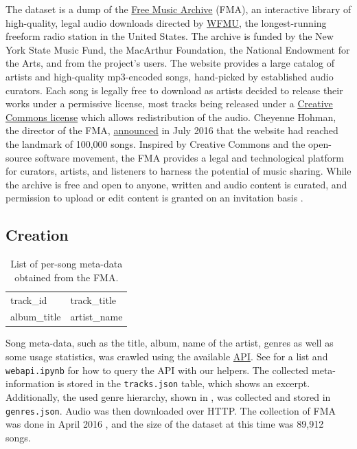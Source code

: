 \documentclass{article}
\newcommand{\todo}[1]{{\color{red} #1 }}
\begin{document}

The dataset is a dump of the \href{https://freemusicarchive.org/}{Free Music Archive} (FMA), an interactive library of high-quality, legal audio downloads directed by \href{https://wfmu.org/}{WFMU}, the longest-running freeform radio station in the United States.
The archive is funded by the New York State Music Fund, the MacArthur Foundation, the National Endowment for the Arts, and from the project's users.
The website provides a large catalog of artists and high-quality mp3-encoded songs, hand-picked by established audio curators. Each song is legally free to download as artists decided to release their works under a permissive license, most tracks being released under a \href{https://creativecommons.org/}{Creative Commons license} which allows redistribution of the audio. Cheyenne Hohman, the director of the FMA, \href{http://freemusicarchive.org/member/cheyenne_h/blog/100000_SONGS}{announced} in July 2016 that the website had reached the landmark of 100,000 songs.
Inspired by Creative Commons and the open-source software movement, the FMA provides a legal and technological platform for curators, artists, and listeners to harness the potential of music sharing. While the archive is free and open to anyone, written and audio content is curated, and permission to upload or edit content is granted on an invitation basis \cite{art:MossFMA}.

\subsection{Creation} %

\begin{table}
	\centering
	\begin{tabular}{|ll|}
		\hline
		track\_id & track\_title \\
		album\_title & artist\_name \\
		\hline
	\end{tabular}
	\caption{List of per-song meta-data obtained from the FMA.}
	\label{tab:metadata}
\end{table}

Song meta-data, such as the title, album, name of the artist, genres as well as some usage statistics, was crawled using the available \href{https://freemusicarchive.org/api}{API}. See  for a list and \texttt{webapi.ipynb} for how to query the API with our helpers. The collected meta-information is stored in the \texttt{tracks.json} table, which  shows an excerpt. Additionally, the used genre hierarchy, shown in , was collected and stored in \texttt{genres.json}. Audio was then downloaded over HTTP. The collection of FMA was done in \todo{April 2016}, and the size of the dataset at this time was 89,912 songs.
\end{document}
